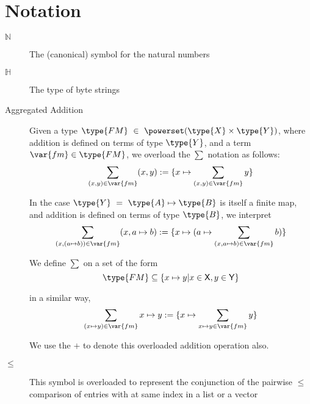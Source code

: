 \section{Notation}
\label{sec:notation-shelley}


\begin{description}
  \item[$\mathbb{N}$] The (canonical) symbol for the natural numbers
  \item[$\mathbb{H}$] The type of byte strings
  \item[Aggregated Addition] Given a type
  $\type{FM}~\in~ \powerset(\type{X} \times \type{Y})$,
    where addition is defined on terms of type $\type{Y}$, and a term $\var{fm} \in \type{FM}$,
    we overload the $\sum$ notation as follows:
    \[\sum_{(x, y)\in\var{fm}} (x,y) :=
    \{ x\mapsto \sum_{(x,y)\in\var{fm}} y \} \]

    In the case $\type{Y}~=~\type{A}\mapsto\type{B}$ is itself a finite map,
    and addition is defined on terms of type $\type{B}$,
    we interpret
    \[\sum_{(x, (a\mapsto b))\in\var{fm}} (x,a\mapsto b) :=
    \{ x \mapsto (a\mapsto \sum_{(x,a\mapsto b)\in\var{fm}} b) \} \]

    We define $\sum$ on a set of the form
    \[\type{FM} \subseteq \{ x \mapsto y \vert x \in \mathsf{X}, y \in \mathsf{Y} \} \]

    in a similar way,
    \[\sum_{(x\mapsto y)\in\var{fm}} x \mapsto y :=
    \{ x\mapsto \sum_{x\mapsto y\in\var{fm}} y \} \]

    We use the $+$ to denote this overloaded addition operation also.

  \item[$\leq$] This symbol is overloaded to represent the conjunction of the
  pairwise $\leq$ comparison of entries with at same index in a list or a vector

\end{description}
\clearpage
